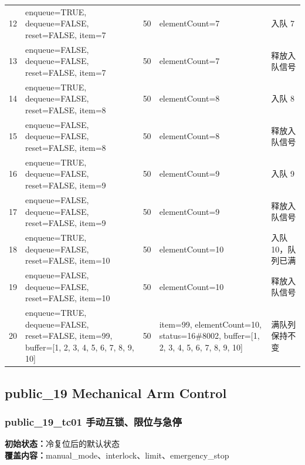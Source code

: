 \begin{longtable}{L{1.0cm}L{4.7cm}L{1.4cm}L{4.0cm}L{2.1cm}}
12 & enqueue=TRUE, dequeue=FALSE, reset=FALSE, item=7 & 50 & elementCount=7 & 入队 7\\

13 & enqueue=FALSE, dequeue=FALSE, reset=FALSE, item=7 & 50 & elementCount=7 & 释放入队信号\\

14 & enqueue=TRUE, dequeue=FALSE, reset=FALSE, item=8 & 50 & elementCount=8 & 入队 8\\

15 & enqueue=FALSE, dequeue=FALSE, reset=FALSE, item=8 & 50 & elementCount=8 & 释放入队信号\\

16 & enqueue=TRUE, dequeue=FALSE, reset=FALSE, item=9 & 50 & elementCount=9 & 入队 9\\

17 & enqueue=FALSE, dequeue=FALSE, reset=FALSE, item=9 & 50 & elementCount=9 & 释放入队信号\\

18 & enqueue=TRUE, dequeue=FALSE, reset=FALSE, item=10 & 50 & elementCount=10 & 入队 10，队列已满\\

19 & enqueue=FALSE, dequeue=FALSE, reset=FALSE, item=10 & 50 & elementCount=10 & 释放入队信号\\

20 & enqueue=TRUE, dequeue=FALSE, reset=FALSE, item=99, buffer=[1, 2, 3, 4, 5, 6, 7, 8, 9, 10] & 50 & item=99, elementCount=10, status=16\#8002, buffer=[1, 2, 3, 4, 5, 6, 7, 8, 9, 10] & 满队列保持不变\\

\bottomrule

\end{longtable}

\subsection{{\ttfamily public\_19} Mechanical Arm Control}

\subsubsection{{\ttfamily public\_19\_tc01} 手动互锁、限位与急停}

\noindent\textbf{初始状态：}冷复位后的默认状态\\

\textbf{覆盖内容：}manual\_mode、interlock、limit、emergency\_stop

